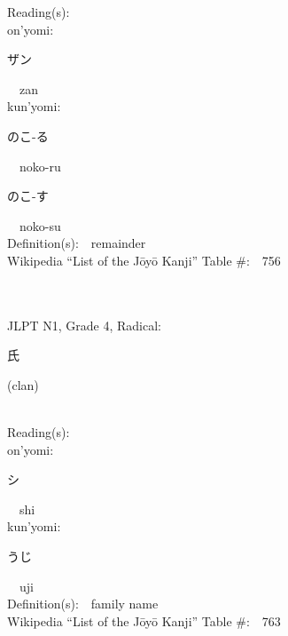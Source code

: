 \begin{multicols}{2}
Reading(s):\ \ \\
{\hspace*{1em}}on'yomi:\ \ \\
{\hspace*{2em}}{\begin{CJK}{UTF8}{min} ザン \end{CJK}}\ \ zan\ \ \\
{\hspace*{1em}}kun'yomi:\ \ \\
{\hspace*{2em}}{\begin{CJK}{UTF8}{min} のこ-る \end{CJK}}\ \ noko-ru\ \ \\
{\hspace*{2em}}{\begin{CJK}{UTF8}{min} のこ-す \end{CJK}}\ \ noko-su\ \ \\
Definition(s):\ \ remainder \\
Wikipedia ``List of the J\=oy\=o Kanji'' Table \#:\ \ 756 \\
\ \ \\
{\fontsize{34pt}{40pt}  }\ \ \\  %
{JLPT N1, Grade 4, Radical:\ \ {\begin{CJK}{UTF8}{min} 氏 \end{CJK}} (clan) } \\
Reading(s):\ \ \\
{\hspace*{1em}}on'yomi:\ \ \\
{\hspace*{2em}}{\begin{CJK}{UTF8}{min} シ \end{CJK}}\ \ shi\ \ \\
{\hspace*{1em}}kun'yomi:\ \ \\
{\hspace*{2em}}{\begin{CJK}{UTF8}{min} うじ \end{CJK}}\ \ uji\ \ \\
Definition(s):\ \ family name \\
Wikipedia ``List of the J\=oy\=o Kanji'' Table \#:\ \ 763 \\
\ \ \\

\end{multicols}
